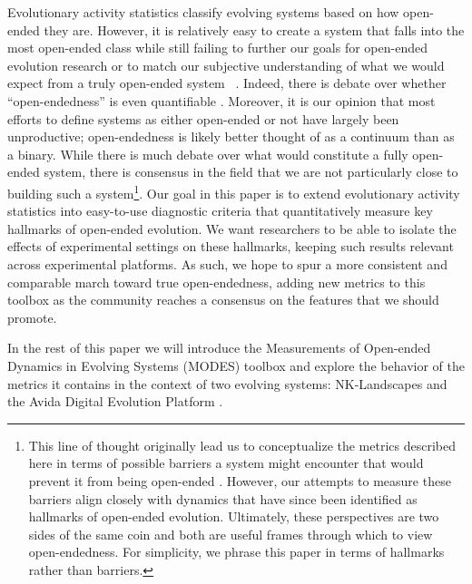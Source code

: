 \documentclass[letterpaper]{article}
\begin{document}
Evolutionary activity statistics classify evolving systems based on how open-ended they are. However, it is relatively easy to create a system that falls into the most open-ended class while still failing to further our goals for open-ended evolution research or to match our subjective understanding of what we would expect from a truly open-ended system ~\cite{maley_four_1999}. Indeed, there is debate over whether ``open-endedness'' is even quantifiable \citep{stanley_role_2016}. Moreover, it is our opinion that most efforts to define systems as either open-ended or not have largely been unproductive; open-endedness is likely better thought of as a continuum than as a binary. While there is much debate over what would constitute a fully open-ended system, there is consensus in the field that we are not particularly close to building such a system\footnote{This line of thought originally lead us to conceptualize the metrics described here in terms of possible barriers a system might encounter that would prevent it from being open-ended \citep{blogpost}. However, our attempts to measure these barriers align closely with dynamics that have since been identified as hallmarks of open-ended evolution. Ultimately, these perspectives are two sides of the same coin and both are useful frames through which to view open-endedness. For simplicity, we phrase this paper in terms of hallmarks rather than barriers.}. 
Our goal in this paper is to extend evolutionary activity statistics into easy-to-use diagnostic criteria that quantitatively measure key hallmarks of open-ended evolution.  We want researchers to be able to isolate the effects of experimental settings on these hallmarks, keeping such results relevant across experimental platforms. As such, we hope to spur a more consistent and comparable march toward true open-endedness, adding new metrics to this toolbox as the community reaches a consensus on the features that we should promote.


In the rest of this paper we will introduce the Measurements of Open-ended Dynamics in Evolving Systems (MODES) toolbox and explore the behavior of the metrics it contains in the context of two evolving systems: NK-Landscapes \citep{kauffman_towards_1987} and the Avida Digital Evolution Platform \citep{ofria_avida:_2004}.
\end{document}
